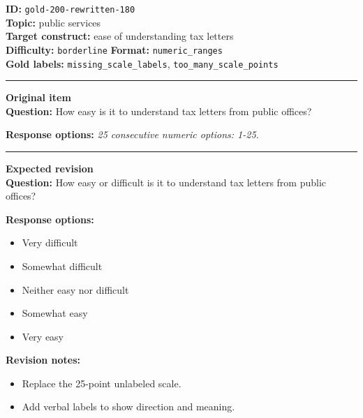 \documentclass[10pt,a4paper]{article}
\newcommand{\sectionline}{\vspace{0.15em}\hrule\vspace{0.35em}}
\begin{document}
\begin{tcolorbox}[colframe=FlawRed,colback=white,colbacktitle=FlawRed!9,coltitle=black,title={Item 180\hfill Flawed item}]
\textbf{ID:} \texttt{gold-200-rewritten-180}\\
\textbf{Topic:} public services\\
\textbf{Target construct:} ease of understanding tax letters\\
\textbf{Difficulty:} \texttt{borderline} \quad \textbf{Format:} \texttt{numeric\_ranges}\\
\textbf{Gold labels:} \texttt{missing\_scale\_labels}, \texttt{too\_many\_scale\_points}\\
\sectionline
\textbf{Original item}\\
\textbf{Question:} How easy is it to understand tax letters from public offices?
\par\textbf{Response options:}
\textit{25 consecutive numeric options: 1-25.}
\sectionline
\textbf{Expected revision}\\
\textbf{Question:} How easy or difficult is it to understand tax letters from public offices?
\par\textbf{Response options:}
\begin{itemize}
\item Very difficult
\item Somewhat difficult
\item Neither easy nor difficult
\item Somewhat easy
\item Very easy
\end{itemize}
\par\textbf{Revision notes:}
\begin{itemize}
\item Replace the 25-point unlabeled scale.
\item Add verbal labels to show direction and meaning.
\end{itemize}
\end{tcolorbox}
\end{document}
